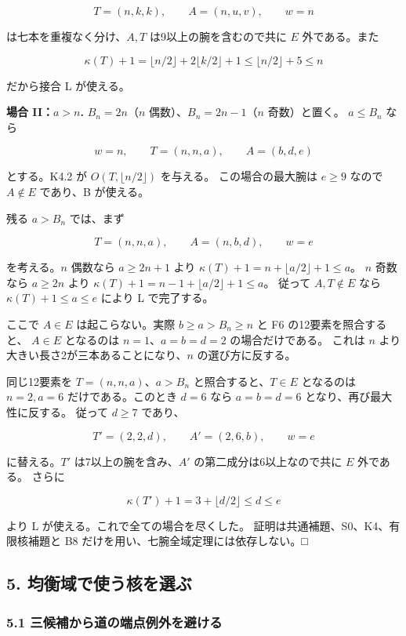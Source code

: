 \documentclass[
  10pt,
  a4paper,
]{article}
\begin{document}
\[
T=(n,k,k),\qquad A=(n,u,v),\qquad w=n
\]

は七本を重複なく分け、\(A,T\) は9以上の腕を含むので共に \(E\)
外である。また

\[
\kappa(T)+1=\lfloor n/2\rfloor+2\lfloor k/2\rfloor+1
\le\lfloor n/2\rfloor+5\le n
\]

だから接合 L が使える。

\textbf{場合 II：\(a>n\).} \(B_n=2n\)（\(n\) 偶数）、\(B_n=2n-1\)（\(n\)
奇数）と置く。 \(a\le B_n\) なら

\[
w=n,\qquad T=(n,n,a),\qquad A=(b,d,e)
\]

とする。K4.2 が \(O(T,\lfloor n/2\rfloor)\) を与える。
この場合の最大腕は \(e\ge9\) なので \(A\notin E\) であり、B が使える。

残る \(a>B_n\) では、まず

\[
T=(n,n,a),\qquad A=(n,b,d),\qquad w=e
\]

を考える。\(n\) 偶数なら \(a\ge2n+1\) より
\(\kappa(T)+1=n+\lfloor a/2\rfloor+1\le a\)。 \(n\) 奇数なら \(a\ge2n\)
より \(\kappa(T)+1=n-1+\lfloor a/2\rfloor+1\le a\)。 従って
\(A,T\notin E\) なら \(\kappa(T)+1\le a\le e\) により L で完了する。

ここで \(A\in E\) は起こらない。実際 \(b\ge a>B_n\ge n\) と F6
の12要素を照合すると、 \(A\in E\) となるのは \(n=1\)、\(a=b=d=2\)
の場合だけである。 これは \(n\)
より大きい長さ2が三本あることになり、\(n\) の選び方に反する。

同じ12要素を \(T=(n,n,a)\)、\(a>B_n\) と照合すると、\(T\in E\)
となるのは \(n=2,a=6\) だけである。このとき \(d=6\) なら \(a=b=d=6\)
となり、再び最大性に反する。 従って \(d\ge7\) であり、

\[
T'=(2,2,d),\qquad A'=(2,6,b),\qquad w=e
\]

に替える。\(T'\) は7以上の腕を含み、\(A'\) の第二成分は6以上なので共に
\(E\) 外である。 さらに

\[
\kappa(T')+1=3+\lfloor d/2\rfloor\le d\le e
\]

より L が使える。これで全ての場合を尽くした。
証明は共通補題、S0、K4、有限核補題と B8
だけを用い、七腕全域定理には依存しない。□

\subsection{5.
均衡域で使う核を選ぶ}\label{ux5747ux8861ux57dfux3067ux4f7fux3046ux6838ux3092ux9078ux3076}

\subsubsection{5.1
三候補から道の端点例外を避ける}\label{ux4e09ux5019ux88dcux304bux3089ux9053ux306eux7aefux70b9ux4f8bux5916ux3092ux907fux3051ux308b}
\end{document}
